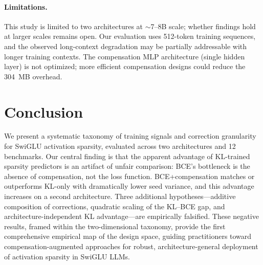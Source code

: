 \documentclass[11pt]{article}
\begin{document}
\paragraph{Limitations.}
This study is limited to two architectures at $\sim$7--8B scale; whether findings hold at larger scales remains open.
Our evaluation uses 512-token training sequences, and the observed long-context degradation may be partially addressable with longer training contexts.
The compensation MLP architecture (single hidden layer) is not optimized; more efficient compensation designs could reduce the 304~MB overhead.


\section{Conclusion}

We present a systematic taxonomy of training signals and correction granularity for SwiGLU activation sparsity, evaluated across two architectures and 12 benchmarks.
Our central finding is that the apparent advantage of KL-trained sparsity predictors is an artifact of unfair comparison: BCE's bottleneck is the absence of compensation, not the loss function.
BCE+compensation matches or outperforms KL-only with dramatically lower seed variance, and this advantage increases on a second architecture.
Three additional hypotheses---additive composition of corrections, quadratic scaling of the KL--BCE gap, and architecture-independent KL advantage---are empirically falsified.
These negative results, framed within the two-dimensional taxonomy, provide the first comprehensive empirical map of the design space, guiding practitioners toward compensation-augmented approaches for robust, architecture-general deployment of activation sparsity in SwiGLU LLMs.


\end{document}
